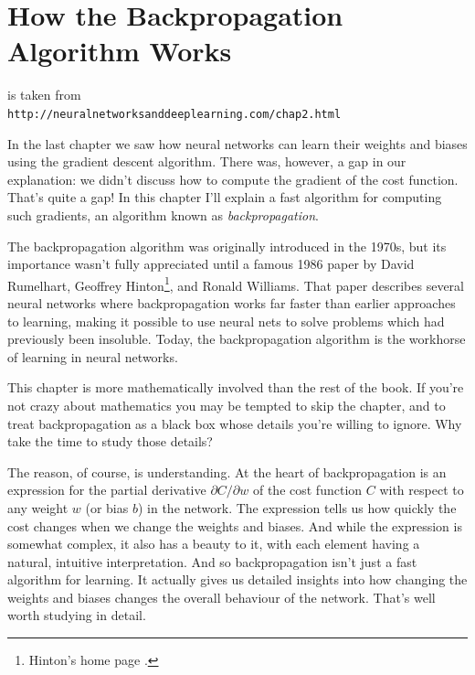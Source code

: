 
\chapter{How the Backpropagation Algorithm Works}


 is taken from\\
\lstinline{http://neuralnetworksanddeeplearning.com/chap2.html}

In the last chapter we saw how neural networks can learn their weights and biases using the gradient descent algorithm. There was, however, a gap in our explanation: we didn't discuss how to compute the gradient of the cost function. That's quite a gap! In this chapter I'll explain a fast algorithm for computing such gradients, an algorithm known as \textit{backpropagation}. 


The backpropagation algorithm was originally introduced in the 1970s, but its importance wasn't fully appreciated until a famous 1986 paper \cite{rumelhart1986} by David Rumelhart, Geoffrey Hinton\footnote{Hinton's home page \cite{Hinton2019}.}, and Ronald Williams. That paper describes several neural networks where backpropagation works far faster than earlier approaches to learning, making it possible to use neural nets to solve problems which had previously been insoluble. Today, the backpropagation algorithm is the workhorse of learning in neural networks.


This chapter is more mathematically involved than the rest of the book. If you're not crazy about mathematics you may be tempted to skip the chapter, and to treat backpropagation as a black box whose details you're willing to ignore. Why take the time to study those details?

The reason, of course, is understanding. At the heart of backpropagation is an expression for the partial derivative $\partial C / \partial w$ of the cost function $C$ with respect to any weight $w$ (or bias $b$) in the network. The expression tells us how quickly the cost changes when we change the weights and biases. And while the expression is somewhat complex, it also has a beauty to it, with each element having a natural, intuitive interpretation. And so backpropagation isn't just a fast algorithm for learning. It actually gives us detailed insights into how changing the weights and biases changes the overall behaviour of the network. That's well worth studying in detail.

